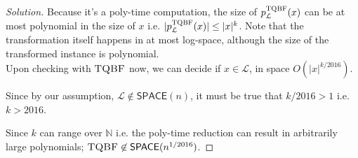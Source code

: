 \documentclass[usletter]{article}
\newcommand {\namedset}[1]     {\ensuremath{\mathbb{#1}}}
\newcommand {\langset}[1]      {\ensuremath{\mathcal{#1}}}
\newcommand {\namedlangset}[1] {\ensuremath{\textnormal{\textsc{#1}}}}
\newcommand {\family}[1]       {\ensuremath{\mathsf{#1}}}
\newcommand{\ie}{\textnormal{i.e. }}
\newcommand {\langL}          {\langset{L}}
\begin{document}
\begin{enumerate}[labelsep=2.5em, label=\textbf{\arabic{enumi}}]
\begin{proof}[Solution]
    Because it's a poly-time computation,
    the size of $p_\langL^\namedlangset{TQBF}(x)$ can be at most polynomial
    in the size of $x$ \ie $|p_\langL^\namedlangset{TQBF}(x)| \leq |x|^k$. Note
    that the transformation itself happens in at most log-space, although the
    size of the transformed instance is polynomial. \\
    Upon checking with \namedlangset{TQBF} now, we can decide if $x \in \langL$,
    in space $O(|x|^{k/2016})$.

    Since by our assumption, $\langL \not\in \family{SPACE}(n)$, it must be true
    that $k/2016 > 1$ \ie $k > 2016$.

    Since $k$ can range over \namedset{N} \ie the poly-time reduction can result
    in arbitrarily large polynomials;
    $\namedlangset{TQBF} \not \in \family{SPACE}(n^{1/2016})$.
  \end{proof}
\end{enumerate}



\end{document}
